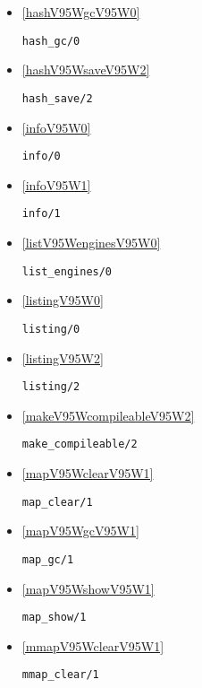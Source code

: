 \begin{itemize}
\item \ref{hashV95WgcV95W0} 
\begin{verbatim}
hash_gc/0
\end{verbatim}

\item \ref{hashV95WsaveV95W2} 
\begin{verbatim}
hash_save/2
\end{verbatim}

\item \ref{infoV95W0} 
\begin{verbatim}
info/0
\end{verbatim}

\item \ref{infoV95W1} 
\begin{verbatim}
info/1
\end{verbatim}

\item \ref{listV95WenginesV95W0} 
\begin{verbatim}
list_engines/0
\end{verbatim}

\item \ref{listingV95W0} 
\begin{verbatim}
listing/0
\end{verbatim}

\item \ref{listingV95W2} 
\begin{verbatim}
listing/2
\end{verbatim}

\item \ref{makeV95WcompileableV95W2} 
\begin{verbatim}
make_compileable/2
\end{verbatim}

\item \ref{mapV95WclearV95W1} 
\begin{verbatim}
map_clear/1
\end{verbatim}

\item \ref{mapV95WgcV95W1} 
\begin{verbatim}
map_gc/1
\end{verbatim}

\item \ref{mapV95WshowV95W1} 
\begin{verbatim}
map_show/1
\end{verbatim}

\item \ref{mmapV95WclearV95W1} 
\begin{verbatim}
mmap_clear/1
\end{verbatim}


\end{itemize}
